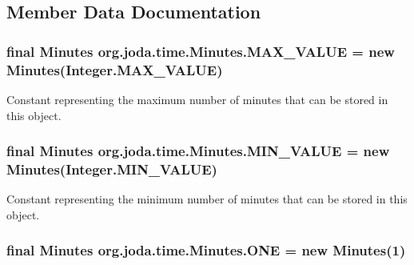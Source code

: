 \subsection{Member Data Documentation}
\hypertarget{classorg_1_1joda_1_1time_1_1_minutes_a68d772fe63e157c9d70332797d501d81}{
\subsubsection[{M\-A\-X\-\_\-\-V\-A\-L\-U\-E}]{\setlength{\rightskip}{0pt plus 5cm}final {\bf Minutes} org.\-joda.\-time.\-Minutes.\-M\-A\-X\-\_\-\-V\-A\-L\-U\-E = new {\bf Minutes}(Integer.\-M\-A\-X\-\_\-\-V\-A\-L\-U\-E)\hspace{0.3cm}{\ttfamily [static]}}}\label{classorg_1_1joda_1_1time_1_1_minutes_a68d772fe63e157c9d70332797d501d81}
Constant representing the maximum number of minutes that can be stored in this object. \hypertarget{classorg_1_1joda_1_1time_1_1_minutes_ad551c2ae2977dcc792cae9e556ced258}{
\subsubsection[{M\-I\-N\-\_\-\-V\-A\-L\-U\-E}]{\setlength{\rightskip}{0pt plus 5cm}final {\bf Minutes} org.\-joda.\-time.\-Minutes.\-M\-I\-N\-\_\-\-V\-A\-L\-U\-E = new {\bf Minutes}(Integer.\-M\-I\-N\-\_\-\-V\-A\-L\-U\-E)\hspace{0.3cm}{\ttfamily [static]}}}\label{classorg_1_1joda_1_1time_1_1_minutes_ad551c2ae2977dcc792cae9e556ced258}
Constant representing the minimum number of minutes that can be stored in this object. \hypertarget{classorg_1_1joda_1_1time_1_1_minutes_a4ddf826c451836fd3b7b9c923ec0836a}{
\subsubsection[{O\-N\-E}]{\setlength{\rightskip}{0pt plus 5cm}final {\bf Minutes} org.\-joda.\-time.\-Minutes.\-O\-N\-E = new {\bf Minutes}(1)\hspace{0.3cm}{\ttfamily [static]}}}\label{classorg_1_1joda_1_1time_1_1_minutes_a4ddf826c451836fd3b7b9c923ec0836a}
